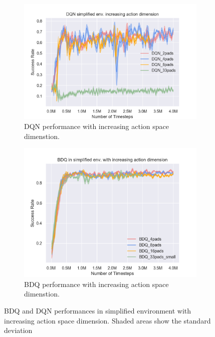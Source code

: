 \begin{figure}[!htbp]
    \begin{subfigure}{0.49\textwidth}
        \includegraphics[width=\linewidth]{figures/DQN_simplified_env_increasing_action_dimension}
        \caption{DQN performance with increasing action space dimenstion.} \label{fig:dqnincrease}
    \end{subfigure}%
    \hspace*{\fill}   %
    \begin{subfigure}{0.49\textwidth}
        \includegraphics[width=\linewidth]{figures/BDQ_in_simplified_env_with_increasing_action_dimension}
        \caption{BDQ performance with increasing action space dimenstion.} \label{fig:bdqincrease}
    \end{subfigure}%
    \hspace*{\fill}   %


\caption{BDQ and DQN performances in simplified environment with increasing action space dimension. Shaded areas show the standard deviation \label{fig:scenes}}
\end{figure}



